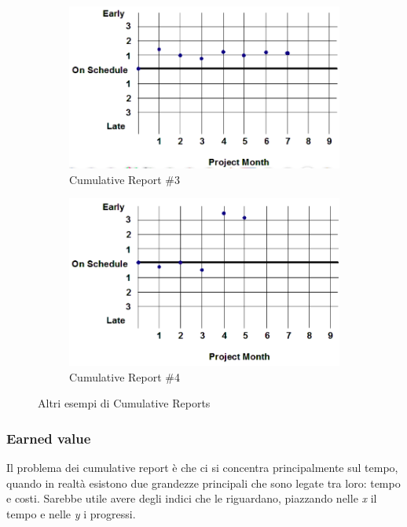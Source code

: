 \begin{figure}[H]
	\centering
	\begin{subfigure}[b]{0.45\textwidth}
		\centering
		\includegraphics[width=\textwidth]{document/img/cumreport3.png}
		\caption{Cumulative Report \#3}
		\label{cumreport3}
	\end{subfigure}
	\hfill
	\begin{subfigure}[b]{0.45\textwidth}
		\centering
		\includegraphics[width=\textwidth]{document/img/cumreport4.png}
		\caption{Cumulative Report \#4}
		\label{cumreport4}
	\end{subfigure}
	\caption{Altri esempi di Cumulative Reports}
\end{figure}

\subsubsection{Earned value}
Il problema dei cumulative report è che ci si concentra principalmente sul tempo, quando in realtà esistono due grandezze principali che sono legate tra loro: tempo e costi. Sarebbe utile avere degli indici che le riguardano, piazzando nelle \textit{x} il tempo e nelle \textit{y} i progressi.

